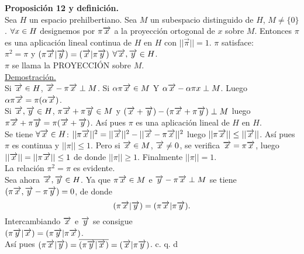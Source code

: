 \textbf{Proposición 12 y definición.} \\
Sea $H$ un espacio prehilbertiano. Sea $M$ un subespacio distinguido de $H$, $M \neq \lbrace 0 \rbrace$. $\forall x \in H$ designemos por $\pi \overrightarrow{x}$ a la proyección ortogonal de $x$ sobre $M$. Entonces $\pi$ es una aplicación lineal continua de $H$ en $H$ con $ || \overrightarrow{\pi}||=1$. $\pi$ satisface: \\
$\pi ^2=\pi$ y $(\pi \overrightarrow{x} | \overrightarrow{y})=(\overrightarrow{x} | \pi \overrightarrow{y})$ $\forall \overrightarrow{x} , \overrightarrow{y} \in H$. \\
$\pi$ se llama la PROYECCIÓN sobre $M$. \\
\underline{Demostración.}\\
Si $\overrightarrow{x} \in H$, $\overrightarrow{x}- \pi \overrightarrow{x} \perp M$. Si $\alpha \pi \overrightarrow{x} \in M$ Y $\alpha \overrightarrow{x} - \alpha \pi x \perp M$. Luego $\alpha \pi \overrightarrow{x} = \pi (\alpha \overrightarrow{x} )$. \\
Si $\overrightarrow{x}, \overrightarrow{y} \in H$, $\pi \overrightarrow{x} + \pi \overrightarrow{y} \in M$ y $(\overrightarrow{x} + \overrightarrow{y})-(\pi \overrightarrow{x} + \pi \overrightarrow{y}) \perp M$ luego $\pi \overrightarrow{x} + \pi \overrightarrow{y}=\pi(\overrightarrow{x} + \overrightarrow{y})$. Así pues $\pi$ es una aplicación lineal de $H$ en $H$. \\
Se tiene $\forall \overrightarrow{x} \in H$: $||\pi \overrightarrow{x} ||^2=||\overrightarrow{x} ||^2-|| \overrightarrow{x} -\pi \overrightarrow{x} ||^2$ luego $|| \pi \overrightarrow{x} || \leq || \overrightarrow{x} ||$. Así pues $\pi$ es continua y $|| \pi || \leq 1$. Pero si $\overrightarrow{x} \in M$, $\overrightarrow{x} \neq 0$, se  verifica $\overrightarrow{x} = \pi \overrightarrow{x}$, luego $|| \overrightarrow{x} ||=|| \pi \overrightarrow{x}|| \leq 1$ de donde $|| \pi || \geq 1$. Finalmente $|| \pi || =1$.\\
La relación $\pi^2=\pi$ es evidente. \\
Sea ahora $\overrightarrow{x}, \overrightarrow{y} \in H$. Ya que $\pi \overrightarrow{x} \in M$ e $\overrightarrow{y}-\pi \overrightarrow{x} \perp M$ se tiene $(\pi \overrightarrow{x}, \overrightarrow{y}-\pi \overrightarrow{y})=0$, de donde 
$$
(\pi \overrightarrow{x} | \overrightarrow{y})=(\pi \overrightarrow{x} | \pi \overrightarrow{y}).
$$
Intercambiando $\overrightarrow{x}$ e $\overrightarrow{y}$ se consigue \\
$(\pi \overrightarrow{y} | \overrightarrow{x})=(\pi \overrightarrow{y} |\pi \overrightarrow{x})$.\\
Así pues $(\pi \overrightarrow{x} | \overrightarrow{y})=\overline{(\pi \overrightarrow{y} | \overrightarrow{x})}=(\overrightarrow{x} | \pi \overrightarrow{y})$.
\phantom{sssssssssssssssssssssssssssssssssss sasdasdasdasdadadssada} c. q. d \\ \\

